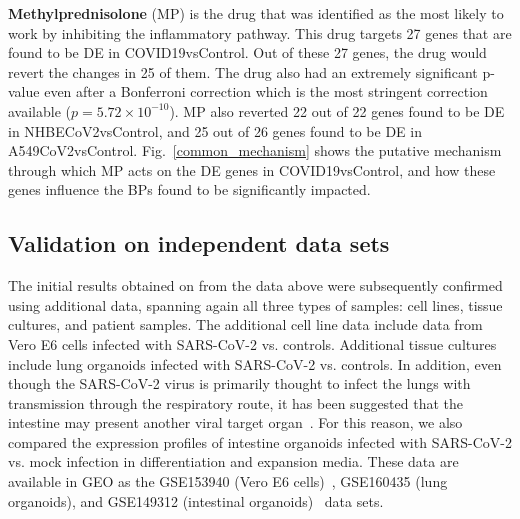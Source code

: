 \documentclass[Minh_PhD_thesis.tex]{subfiles}
\begin{document}
 \textbf{Methylprednisolone} (MP) is the drug that was identified as the most likely to work by inhibiting the inflammatory pathway. This drug targets 27 genes that are found to be DE in COVID19vsControl. Out of these 27 genes, the drug would revert the changes in 25 of them. The drug also had an extremely significant p-value even after a Bonferroni correction which is the most stringent correction available ($p=5.72\times 10^{-10}$). MP also reverted 22 out of 22 genes found to be DE in NHBECoV2vsControl, and 25 out of 26 genes found to be DE in A549CoV2vsControl. 
Fig.~\ref{common_mechanism}  shows the putative mechanism through which MP acts on the DE genes in COVID19vsControl, and how these genes influence the BPs found to be significantly impacted.



\subsection{Validation on independent data sets}
The initial results obtained on from the data above were subsequently confirmed using additional data, spanning again all  three types of samples: cell lines, tissue cultures, and patient samples.   The additional cell line data include data from Vero E6 cells infected with SARS-CoV-2 vs. controls. Additional tissue cultures include lung organoids infected with SARS-CoV-2 vs. controls. In addition, even though the SARS-CoV-2 virus is primarily thought to infect the lungs with transmission through the respiratory route, it has been suggested that the intestine may present another viral target organ~\cite{Lamers:2020}. For this reason, we also compared the expression profiles of intestine organoids infected with SARS-CoV-2 vs. mock infection in differentiation and expansion media. These data are available in GEO as the GSE153940 (Vero E6 cells)~\cite{Riva:2020}, GSE160435 (lung organoids), and GSE149312 (intestinal organoids)~\cite{Lamers:2020} data sets. 
\end{document}
